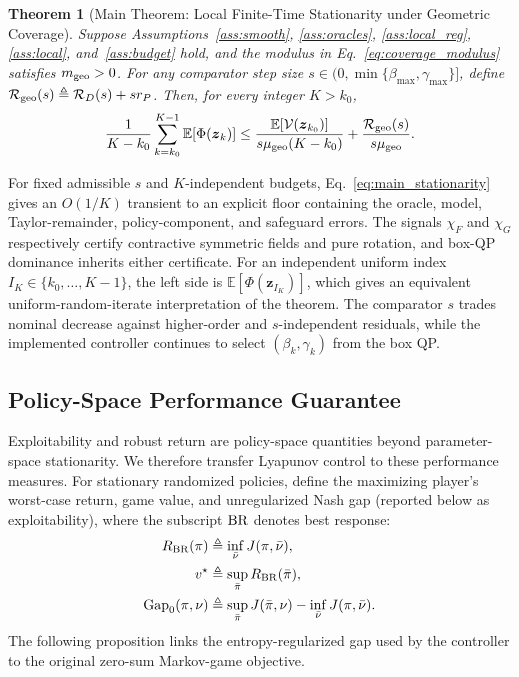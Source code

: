 \documentclass[journal]{IEEEtran}
\newtheorem{theorem}{Theorem}
\theoremstyle{remark}
\newcommand{\E}{\mathbb{E}}
\newcommand{\bz}{\boldsymbol{z}}
\newcommand{\Vk}{\mathcal{V}}
\begin{document}
	\begin{theorem}[Main Theorem: Local Finite-Time Stationarity under Geometric Coverage]\label{thm:ergodic}
		Suppose Assumptions~\ref{ass:smooth}, \ref{ass:oracles}, \ref{ass:local_reg}, \ref{ass:local}, and~\ref{ass:budget} hold, and the modulus in Eq.~\eqref{eq:coverage_modulus} satisfies $m_{\rm geo}>0$.
		For any comparator step size $s\in(0,\min\{\beta_{\max},\gamma_{\max}\}]$, define $\mathcal R_{\rm geo}(s)\triangleq\mathcal R_D(s)+sr_P$.
		Then, for every integer $K>k_0$,
		\begin{equation}\label{eq:main_stationarity}
			\frac{1}{K-k_{0}}
			\sum_{k=k_{0}}^{K-1}\E[\Phi(\bz_{k})]
			\le
			\frac{\E[\Vk(\bz_{k_{0}})]}{s\mu_{\rm geo}(K-k_{0})}
			+
			\frac{\mathcal R_{\rm geo}(s)}{s\mu_{\rm geo}}.
		\end{equation}
	\end{theorem}
	
	For fixed admissible $s$ and $K$-independent budgets, Eq.~\eqref{eq:main_stationarity} gives an $O(1/K)$ transient to an explicit floor containing the oracle, model, Taylor-remainder, policy-component, and safeguard errors.
	The signals $\chi_F$ and $\chi_G$ respectively certify contractive symmetric fields and pure rotation, and box-QP dominance inherits either certificate.
	For an independent uniform index $I_K\in\{k_0,\ldots,K-1\}$, the left side is $\E[\Phi(\bz_{I_K})]$, which gives an equivalent uniform-random-iterate interpretation of the theorem.
	The comparator $s$ trades nominal decrease against higher-order and $s$-independent residuals, while the implemented controller continues to select $(\beta_k,\gamma_k)$ from the box QP.
	
	\subsection{Policy-Space Performance Guarantee}\label{subsec:performance_guarantee}
	
	Exploitability and robust return are policy-space quantities beyond parameter-space stationarity.
	We therefore transfer Lyapunov control to these performance measures.
	For stationary randomized policies, define the maximizing player's worst-case return, game value, and unregularized Nash gap (reported below as exploitability), where the subscript ${\rm BR}$ denotes best response:
	\begin{align}
		R_{\rm BR}(\pi)&\triangleq\inf_{\bar\nu}J(\pi,\bar\nu),\notag\\
		v^{\star}&\triangleq\sup_{\bar\pi}R_{\rm BR}(\bar\pi),\notag\\
		\operatorname{Gap}_{0}(\pi,\nu)
		&\triangleq
		\sup_{\bar\pi}J(\bar\pi,\nu)-\inf_{\bar\nu}J(\pi,\bar\nu).
		\label{eq:global_gap}
	\end{align}
	The following proposition links the entropy-regularized gap used by the controller to the original zero-sum Markov-game objective.
	
\end{document}
